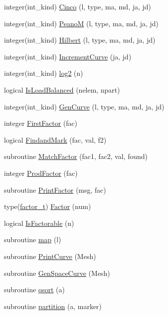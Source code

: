 \begin{DoxyCompactItemize}
\item 
integer(int\_\-kind) \hyperlink{namespaceice__spacecurve_a03cdfff51ffab50dee8974ba594b53bb}{Cinco} (l, type, ma, md, ja, jd)
\item 
integer(int\_\-kind) \hyperlink{namespaceice__spacecurve_afe83a0d2757c7c07a40d410b98e66728}{PeanoM} (l, type, ma, md, ja, jd)
\item 
integer(int\_\-kind) \hyperlink{namespaceice__spacecurve_aceffac45ebe5bc652860f543913c8c83}{Hilbert} (l, type, ma, md, ja, jd)
\item 
integer(int\_\-kind) \hyperlink{namespaceice__spacecurve_a3b9b759e23a9275195d27bdf3b78ebfa}{IncrementCurve} (ja, jd)
\item 
integer(int\_\-kind) \hyperlink{namespaceice__spacecurve_a2010d172fdabf272358d0f809c046175}{log2} (n)
\item 
logical \hyperlink{namespaceice__spacecurve_a2f6ae79d60cad9d3e019550e76cb5706}{IsLoadBalanced} (nelem, npart)
\item 
integer(int\_\-kind) \hyperlink{namespaceice__spacecurve_ae30af6486456c0f4098a6c03aea8ec6d}{GenCurve} (l, type, ma, md, ja, jd)
\item 
integer \hyperlink{namespaceice__spacecurve_a6c86eb0e04276a6417a2010753af3895}{FirstFactor} (fac)
\item 
logical \hyperlink{namespaceice__spacecurve_a269b5f206b1895faa78dfb38c8a5cc4e}{FindandMark} (fac, val, f2)
\item 
subroutine \hyperlink{namespaceice__spacecurve_a873b84a1b720159b0a0d4dd6a4f1df1c}{MatchFactor} (fac1, fac2, val, found)
\item 
integer \hyperlink{namespaceice__spacecurve_a57f86858b3f4450ed95750ff8405f12f}{ProdFactor} (fac)
\item 
subroutine \hyperlink{namespaceice__spacecurve_a64dc0958c7c88a5de6316e7c2f6189b5}{PrintFactor} (msg, fac)
\item 
type(\hyperlink{typeice__spacecurve_1_1factor__t}{factor\_\-t}) \hyperlink{namespaceice__spacecurve_a0e21c6fb09762431569057a3a6a1ceac}{Factor} (num)
\item 
logical \hyperlink{namespaceice__spacecurve_a918d591b92dcee27d6d7f50c92022d69}{IsFactorable} (n)
\item 
subroutine \hyperlink{namespaceice__spacecurve_a841d5cc5194de1c7aef94576c0eb5405}{map} (l)
\item 
subroutine \hyperlink{namespaceice__spacecurve_ab6b0639f3e032362a2ad97a2e4e160e5}{PrintCurve} (Mesh)
\item 
subroutine \hyperlink{namespaceice__spacecurve_a317f0810215a0c684a8073ff21eb71b1}{GenSpaceCurve} (Mesh)
\item 
subroutine \hyperlink{namespaceice__spacecurve_aa67766fe40142781287d478cff83322e}{qsort} (a)
\item 
subroutine \hyperlink{namespaceice__spacecurve_a99e4bd1c6625a5a14e10c5fa91f0df33}{partition} (a, marker)
\end{DoxyCompactItemize}
